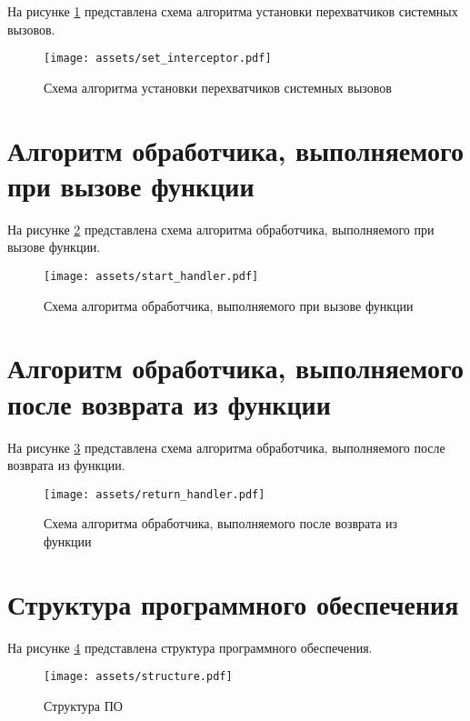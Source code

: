На рисунке \ref{img:set_interceptor} представлена схема алгоритма установки перехватчиков системных вызовов.

\begin{figure}[h!]
    \centering
    \texttt{[image: assets/set\_interceptor.pdf]}
    \caption{Схема алгоритма установки перехватчиков системных вызовов}
    \label{img:set_interceptor}
\end{figure}

\newpage

\section{Алгоритм обработчика, выполняемого при вызове функции}

На рисунке \ref{img:start_handler} представлена схема алгоритма обработчика, выполняемого при вызове функции.

\begin{figure}[h!]
    \centering
    \texttt{[image: assets/start\_handler.pdf]}
    \caption{Схема алгоритма обработчика, выполняемого при вызове функции}
    \label{img:start_handler}
\end{figure}

\newpage

\section{Алгоритм обработчика, выполняемого после возврата из функции}

На рисунке \ref{img:return_handler} представлена схема алгоритма обработчика, выполняемого после возврата из функции.

\begin{figure}[h!]
    \centering
    \texttt{[image: assets/return\_handler.pdf]}
    \caption{Схема алгоритма обработчика, выполняемого после возврата из функции}
    \label{img:return_handler}
\end{figure}

\newpage

\section{Структура программного обеспечения}

На рисунке \ref{img:structure} представлена структура программного обеспечения.

\begin{figure}[h!]
    \centering
    \texttt{[image: assets/structure.pdf]}
    \caption{Структура ПО}
    \label{img:structure}
\end{figure}

